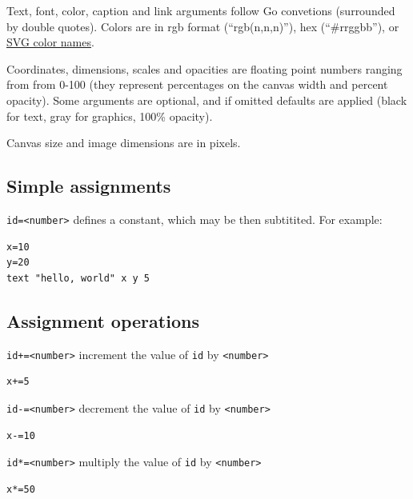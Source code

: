 Text, font, color, caption and link arguments follow Go convetions
(surrounded by double quotes). Colors are in rgb format
(``rgb(n,n,n)''), hex (``\#rrggbb''), or
\href{https://www.w3.org/TR/SVG11/types.html\#ColorKeywords}{SVG color
names}.

Coordinates, dimensions, scales and opacities are floating point numbers
ranging from from 0-100 (they represent percentages on the canvas width
and percent opacity). Some arguments are optional, and if omitted
defaults are applied (black for text, gray for graphics, 100\% opacity).

Canvas size and image dimensions are in pixels.

\hypertarget{simple-assignments}{%
\subsection{Simple assignments}\label{simple-assignments}}

\texttt{id=\textless{}number\textgreater{}} defines a constant, which
may be then subtitited. For example:

\begin{verbatim}
x=10
y=20
text "hello, world" x y 5
\end{verbatim}

\hypertarget{assignment-operations}{%
\subsection{Assignment operations}\label{assignment-operations}}

\texttt{id+=\textless{}number\textgreater{}} increment the value of
\texttt{id} by \texttt{\textless{}number\textgreater{}}

\begin{verbatim}
x+=5
\end{verbatim}

\texttt{id-=\textless{}number\textgreater{}} decrement the value of
\texttt{id} by \texttt{\textless{}number\textgreater{}}

\begin{verbatim}
x-=10
\end{verbatim}

\texttt{id*=\textless{}number\textgreater{}} multiply the value of
\texttt{id} by \texttt{\textless{}number\textgreater{}}

\begin{verbatim}
x*=50
\end{verbatim}

